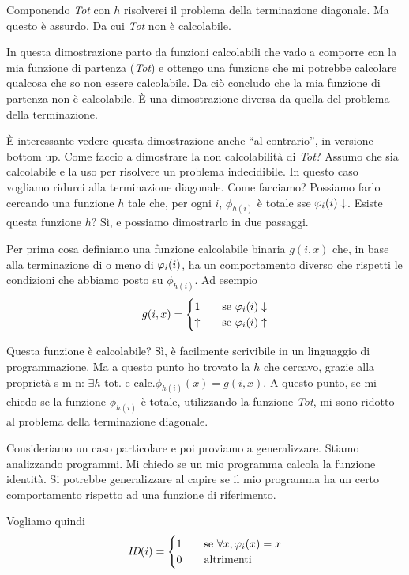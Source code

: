 Componendo \textit{Tot} con $h$ risolverei il problema della terminazione diagonale. Ma questo è
assurdo. Da cui \textit{Tot} non è calcolabile.

In questa dimostrazione parto da funzioni calcolabili che vado a comporre con la mia funzione di
partenza (\textit{Tot}) e ottengo una funzione che mi potrebbe calcolare qualcosa che so non essere
calcolabile. Da ciò concludo che la mia funzione di partenza non è calcolabile. È una
dimostrazione diversa da quella del problema della terminazione.

È interessante vedere questa dimostrazione anche ``al contrario'', in versione bottom up. Come
faccio a dimostrare la non calcolabilità di \textit{Tot}? Assumo che sia calcolabile e la uso per
risolvere un problema indecidibile. In questo caso vogliamo ridurci alla terminazione diagonale.
Come facciamo? Possiamo farlo cercando una funzione $h$ tale che, per ogni $i$, $\phi_{h(i)}$ è totale sse
$\varphi_{i}(i) \downarrow$. Esiste questa funzione $h$? Sì, e possiamo dimostrarlo in due passaggi.

Per prima cosa definiamo una funzione calcolabile binaria $g(i,x)$ che, in base alla terminazione di
o meno di $\varphi_{i}(i)$, ha un comportamento diverso che rispetti le condizioni che abbiamo posto su
$\phi_{h(i)}$. Ad esempio
\begin{equation*}
    g(i,x) =
    \begin{cases}
        1 \quad &\text{se $\varphi_{i}(i)\downarrow$} \\
        \uparrow \quad &\text{se $\varphi_{i}(i)\uparrow$} \\
    \end{cases}
\end{equation*}

Questa funzione è calcolabile? Sì, è facilmente scrivibile in un linguaggio di programmazione. Ma a
questo punto ho trovato la $h$ che cercavo, grazie alla proprietà s-m-n: $\exists h \text{ tot. e
calc.} \phi_{h(i)}(x) = g(i,x)$. A questo punto, se mi chiedo se la funzione $\phi_{h(i)}$ è totale,
utilizzando la funzione \textit{Tot}, mi sono ridotto al problema della terminazione diagonale.

Consideriamo un caso particolare e poi proviamo a generalizzare. Stiamo analizzando programmi. Mi
chiedo se un mio programma calcola la funzione identità. Si potrebbe generalizzare al capire se il
mio programma ha un certo comportamento rispetto ad una funzione di riferimento.

Vogliamo quindi
\begin{equation*}
    \textit{ID}(i) =
    \begin{cases}
        1 \quad &\text{se $\forall x, \varphi_{i}(x) = x$} \\
        0 \quad &\text{altrimenti}
    \end{cases}
\end{equation*}

